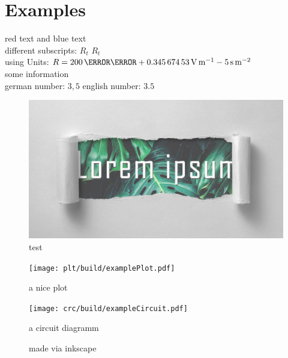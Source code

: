 \documentclass[	%
		11pt,a4paper,	%
		twoside,		%
		english,		%
		f1				%
	]{HsH-report}		%
\begin{document}
\maketitle				%
\declarationAuthorship

\begin{abstract}
	\lipsum[5-8]
\end{abstract}

\tableofcontents

\cleardoublepage %

\chapter{Examples}
	\label{chap: one}
	{\color{red}red text} and {\color{blue}blue text} \\
	different subscripts: \normalsubscripts$R_t$ \upsubscripts$R_t$ \\
	using Units: $R=200\,\milli\ohm + \SI{0.34567453}{\volt\per\metre} - 5\,\si{\second\per\metre\squared}$ \\
	some information\cite{laboranleitung:physik}\\
	german number: $3,5$ english number: $3.5$\\
	\begin{figure}
		\centering
		\includegraphics[width=.6\textwidth]{img/lorem-ipsum.jpg}
		\caption{test}
	\end{figure}

	\begin{figure}
		\centering
		\texttt{[image: plt/build/examplePlot.pdf]}
		\caption{a nice plot}
	\end{figure}

	\begin{figure}
		\centering
		\texttt{[image: crc/build/exampleCircuit.pdf]}
		\caption{a circuit diagramm}
	\end{figure}

	\begin{figure}
		\centering
		\graphicspath{{svg/build/}} %
		
		\caption{made via inkscape}
	\end{figure}
\end{document}
